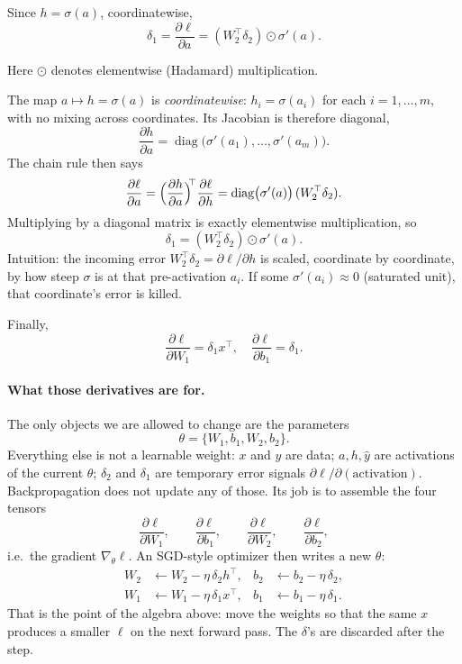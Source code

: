 \documentclass[11pt,a4paper]{article}
\theoremstyle{definition}
\begin{document}
\begin{example}
Since $h = \sigma(a)$, coordinatewise,
\[
\delta_1 = \frac{\partial \ell}{\partial a} = (W_2^\top \delta_2) \odot \sigma'(a).
\]

Here $\odot$ denotes elementwise (Hadamard) multiplication.

\begin{remark}
The map $a\mapsto h=\sigma(a)$ is \emph{coordinatewise}: $h_i=\sigma(a_i)$ for each $i=1,\ldots,m$, with no mixing across coordinates. Its Jacobian is therefore diagonal,
\[
\frac{\partial h}{\partial a}
=
\operatorname{diag}\bigl(\sigma'(a_1),\ldots,\sigma'(a_m)\bigr).
\]
The chain rule then says
\[
\frac{\partial \ell}{\partial a}
=
\Bigl(\frac{\partial h}{\partial a}\Bigr)^{\!\!\top}
\frac{\partial \ell}{\partial h}
=
\operatorname{diag}\bigl(\sigma'(a)\bigr)\,
(W_2^\top\delta_2).
\]
Multiplying by a diagonal matrix is exactly elementwise multiplication, so
\[
\delta_1
=
(W_2^\top\delta_2)\odot\sigma'(a).
\]
Intuition: the incoming error $W_2^\top\delta_2=\partial\ell/\partial h$ is scaled, coordinate by coordinate, by how steep $\sigma$ is at that pre-activation $a_i$. If some $\sigma'(a_i)\approx 0$ (saturated unit), that coordinate's error is killed.
\end{remark}

Finally,
\[
\frac{\partial \ell}{\partial W_1} = \delta_1 x^\top, \quad \frac{\partial \ell}{\partial b_1} = \delta_1.
\]

\paragraph*{What those derivatives are for.}
The only objects we are allowed to change are the parameters
\[
\theta=\{W_1,b_1,W_2,b_2\}.
\]
Everything else is not a learnable weight: $x$ and $y$ are data; $a,h,\hat{y}$ are activations of the current $\theta$; $\delta_2$ and $\delta_1$ are temporary error signals $\partial\ell/\partial(\text{activation})$. Backpropagation does not update any of those. Its job is to assemble the four tensors
\[
\frac{\partial\ell}{\partial W_1},\qquad
\frac{\partial\ell}{\partial b_1},\qquad
\frac{\partial\ell}{\partial W_2},\qquad
\frac{\partial\ell}{\partial b_2},
\]
i.e.\ the gradient $\nabla_\theta\ell$. An SGD-style optimizer then writes a new $\theta$:
\begin{align*}
W_2 &\leftarrow W_2 - \eta\,\delta_2 h^\top, &
b_2 &\leftarrow b_2 - \eta\,\delta_2, \\
W_1 &\leftarrow W_1 - \eta\,\delta_1 x^\top, &
b_1 &\leftarrow b_1 - \eta\,\delta_1.
\end{align*}
That is the point of the algebra above: move the weights so that the same $x$ produces a smaller $\ell$ on the next forward pass. The $\delta$'s are discarded after the step.
\end{example}
\end{document}
